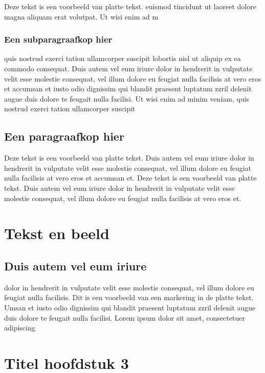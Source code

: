 \documentclass[dutch]{uureport}
\begin{document}
Deze tekst is een voorbeeld van platte tekst. euismod tincidunt ut
laoreet dolore magna aliquam erat volutpat. Ut wisi enim ad m

\subsection{Een subparagraafkop hier}

  quis nostrud exerci tation ullamcorper suscipit lobortis nisl ut aliquip ex ea commodo consequat. Duis autem vel eum iriure dolor in hendrerit in vulputate velit esse molestie consequat, vel illum dolore eu feugiat nulla facilisis at vero eros et accumsan et iusto odio dignissim qui blandit praesent luptatum zzril delenit augue duis dolore te feugait nulla facilisi. Ut wisi enim ad minim veniam, quis nostrud exerci tation ullamcorper suscipit

\section{Een paragraafkop hier}

Deze tekst is een voorbeeld van platte tekst. Duis autem vel eum iriure dolor in hendrerit in vulputate velit esse molestie consequat, vel illum dolore eu feugiat nulla facilisis at vero eros et accumsan et. 
Deze tekst is een voorbeeld van platte tekst. Duis autem vel eum iriure dolor in hendrerit in vulputate velit esse molestie consequat, vel illum dolore eu feugiat nulla facilisis at vero eros et.

\chapter{Tekst en beeld}


\section{Duis autem vel eum iriure}

dolor in hendrerit in vulputate velit esse molestie consequat, vel
illum dolore eu feugiat nulla facilisis. Dit is een voorbeeld van een
markering in de platte tekst. Umsan et iusto odio dignissim qui
blandit praesent luptatum zzril delenit augue duis dolore te feugait
nulla facilisi. Lorem ipsum dolor sit amet, consectetuer adipiscing

\chapter{Titel hoofdstuk 3}
\end{document}

